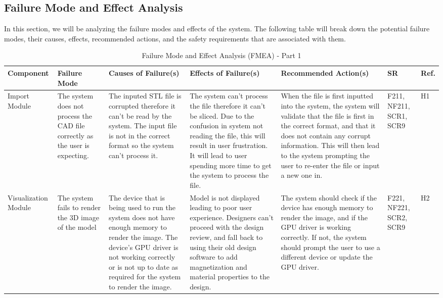 \documentclass{article}
\begin{document}
\begin{landscape}
\section{Failure Mode and Effect Analysis}
In this section, we will be analyzing the failure modes and effects of the system. The following table will break down the potential failure modes, their causes, effects, recommended actions, and the safety requirements that are associated with them.
\begin{table}[H]
\centering
\caption{Failure Mode and Effect Analysis (FMEA) - Part 1}
\renewcommand{\arraystretch}{1.1} 
\footnotesize 
\begin{tabular}{|p{3cm}|p{3cm}|p{3.8cm}|p{3.8cm}|p{5.5cm}|p{2cm}|p{1cm}|}
\hline
\textbf{Component} & \textbf{Failure Mode} & \textbf{Causes of Failure(s)} & \textbf{Effects of Failure(s)} & \textbf{Recommended Action(s)} & \textbf{SR} & \textbf{Ref.} \\
\hline
Import Module & The system does not process the CAD file correctly as the user is expecting. & \textbullet{} The inputed STL file is corrupted therefore it can't be read by the system.\newline \textbullet{} The input file is not in the correct format so the system can't process it.& \textbullet{} The system can't process the file therefore it can't be sliced. \newline \textbullet{} Due to the confusion in system not reading the file, this will result in user frustration. \newline \textbullet{} It will lead to user spending more time to get the system to process the file. & When the file is first inputted into the system, the system will validate that the file is first in the correct format, and that it does not contain any corrupt information. This will then lead to the system prompting the user to re-enter the file or input a new one in. & F211, NF211, SCR1, SCR9 & H1 \\
\hline
Visualization Module & The system fails to render the 3D image of the model & \textbullet{} The device that is being used to run the system does not have enough memory to render the image. \newline \textbullet{} The device's GPU driver is not working correctly or is not up to date as required for the system to render the image. & \textbullet{} Model is not displayed leading to poor user experience. \newline \textbullet{} Designers can't proceed with the design review, and fall back to using their old design software to add magnetization and material properties to the design. & The system should check if the device has enough memory to render the image, and if the GPU driver is working correctly. If not, the system should prompt the user to use a different device or update the GPU driver. & F221, NF221, SCR2, SCR9 & H2 \\

\end{tabular}
\end{table}
\end{landscape}
\end{document}
